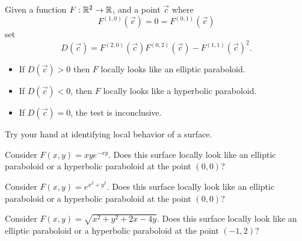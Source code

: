 \documentclass{ximera}
\begin{document}
\begin{theorem}
  Given a function $F:\mathbb R^2\to \mathbb R$, and a point $\vec{c}$ where
  \[
  F^{(1,0)}(\vec{c}) = 0 = F^{(0,1)}(\vec{c}) 
  \]
  set
  \[
  D(\vec{c}) = F^{(2,0)}(\vec{c})F^{(0,2)}(\vec{c})-F^{(1,1)}(\vec{c})^2.
  \]
  \begin{itemize}
  \item If $D(\vec{c})>0$ then $F$ locally looks like an elliptic paraboloid.
  \item	If $D(\vec{c})<0$, then $F$ locally looks like a hyperbolic paraboloid.
  \item If $D(\vec{c})=0$, the test is inconclusive.
  \end{itemize}
\end{theorem}

Try your hand at identifying local behavior of a surface.

\begin{question}
  Consider $F(x,y) = x y e^{-xy}$. Does this surface locally look like
  an elliptic paraboloid or a hyperbolic paraboloid at the point
  $(0,0)$?
  \begin{prompt}
    \begin{multipleChoice}
    \end{multipleChoice}
  \end{prompt}
\end{question}


\begin{question}
  Consider $F(x,y) = e^{x^2+y^2}$. Does this surface locally look like
  an elliptic paraboloid or a hyperbolic paraboloid at the point
  $(0,0)$?
  \begin{prompt}
    \begin{multipleChoice}
    \end{multipleChoice}
  \end{prompt}
\end{question}


\begin{question}
  Consider $F(x,y) = \sqrt{x^2+y^2+2x-4y}$. Does this surface locally look like
  an elliptic paraboloid or a hyperbolic paraboloid at the point
  $(-1,2)$?
  \begin{prompt}
    \begin{multipleChoice}
    \end{multipleChoice}
  \end{prompt}
\end{question}
\end{document}
